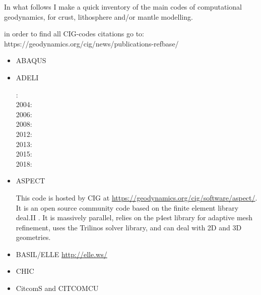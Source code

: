 
In what follows I make a quick inventory of the main codes of computational geodynamics, 
for crust, lithosphere and/or mantle modelling.

in order to find all CIG-codes citations go to: https://geodynamics.org/cig/news/publications-refbase/

\begin{itemize}

\item ABAQUS

\cite{gedh02}
\cite{fumr03}
\cite{camg07}
\cite{kuhe09}
\cite{camg10}
\cite{makh09}
\cite{nalr12}
\cite{pevp15}
\cite{naam17}


\item ADELI

: \cite{hajc97}\\
2004: \cite{gocl04}\\
2006: \cite{vech06} \\
2008: \cite{boht08a}\cite{boht08b}\\
2012: \cite{gech12}\cite{gigh12}\\
2013: \cite{wahd13}\\
2015: \cite{ceag15}\\
2018: \cite{cegm18}\cite{gehn18}

\item ASPECT

This code is hosted by CIG at \url{https://geodynamics.org/cig/software/aspect/}. 
It is an open source community code based on the finite element library deal.II \cite{arbc19}. 
It is massively parallel, relies on the p4est library for adaptive mesh refinement,
uses the Trilinos solver library, and can deal with 2D and 3D geometries. 

\cite{bahk07}
\cite{krhb12}
\cite{aupm15}
\cite{tosn15}
\cite{dahe16}
\cite{gadb16}
\cite{zhon16}
\cite{hepb17}
\cite{daef17}
\cite{hedg17}
\cite{robh17}
\cite{robu17}
\cite{aumh17}
\cite{thie17}
\cite{brsg17}
\cite{onmz17}
\cite{tasm17}
\cite{zhli17}
\cite{daga18}
\cite{onzh18}
\cite{gltf18}
\cite{heps18}
\cite{galh18}
\cite{peka18}
\cite{puth18}
\cite{brst18b}
\cite{baba19}
\cite{stbl19}
\cite{cocf19}
\cite{liki19}

\item BASIL/ELLE \url{http://elle.ws/}
\cite{bokj08}
\cite{llor19}

\item CHIC 
\cite{norv15}

\item CitcomS and CITCOMCU


\end{itemize}
